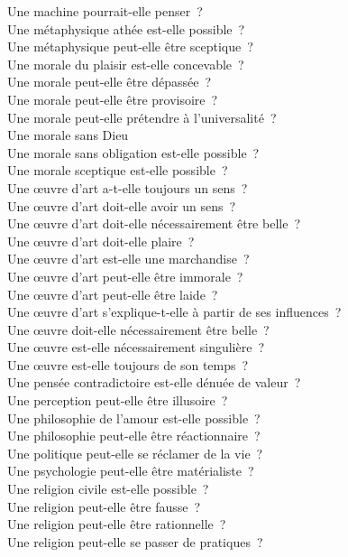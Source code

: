 \documentclass[a4paper,12pt]{article}
\begin{document}
Une machine pourrait-elle penser ? \\
Une métaphysique athée est-elle possible ? \\
Une métaphysique peut-elle être sceptique ? \\
Une morale du plaisir est-elle concevable ? \\
Une morale peut-elle être dépassée ? \\
Une morale peut-elle être provisoire ? \\
Une morale peut-elle prétendre à l'universalité ? \\
Une morale sans Dieu \\
Une morale sans obligation est-elle possible ? \\
Une morale sceptique est-elle possible ? \\
Une œuvre d'art a-t-elle toujours un sens ? \\
Une œuvre d'art doit-elle avoir un sens ? \\
Une œuvre d'art doit-elle nécessairement être belle ? \\
Une œuvre d'art doit-elle plaire ? \\
Une œuvre d'art est-elle une marchandise ? \\
Une œuvre d'art peut-elle être immorale ? \\
Une œuvre d'art peut-elle être laide ? \\
Une œuvre d'art s'explique-t-elle à partir de ses influences ? \\
Une œuvre doit-elle nécessairement être belle ? \\
Une œuvre est-elle nécessairement singulière ? \\
Une œuvre est-elle toujours de son temps ? \\
Une pensée contradictoire est-elle dénuée de valeur ? \\
Une perception peut-elle être illusoire ? \\
Une philosophie de l'amour est-elle possible ? \\
Une philosophie peut-elle être réactionnaire ? \\
Une politique peut-elle se réclamer de la vie ? \\
Une psychologie peut-elle être matérialiste ? \\
Une religion civile est-elle possible ? \\
Une religion peut-elle être fausse ? \\
Une religion peut-elle être rationnelle ? \\
Une religion peut-elle se passer de pratiques ? \\
\end{document}
